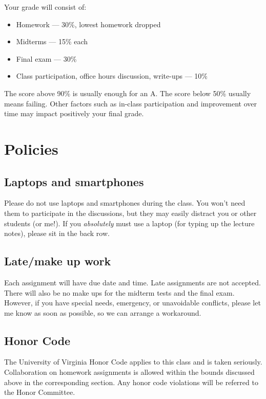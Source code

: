 \documentclass[oneside,11pt]{amsart}
\begin{document}
Your grade will consist of:
\begin{itemize}
	\item Homework --- 30\%, lowest homework dropped
	\item Midterms --- 15\% each
	\item Final exam --- 30\%
	\item Class participation, office hours discussion, write-ups --- 10\%
\end{itemize}
The score above 90\% is usually enough for an A.
The score below 50\% usually means failing.
Other factors such as in-class participation
and improvement over time may impact positively your final grade.













\section{Policies}

\subsection{Laptops and smartphones}

Please do not use laptops and smartphones during the class.
You won't need them to participate in the discussions, but they may easily distract
you or other students (or me!). If you \emph{absolutely} must use a laptop
(for typing up the lecture notes), please sit in the back row.

\subsection{Late/make up work} Each assignment will have due date and time.
Late assignments are not accepted. There will also be no make ups for the midterm tests and the final exam.
However, if you have special needs, emergency, or unavoidable conflicts, please
let me know as soon as possible, so we can arrange a workaround.

\subsection{Honor Code} The University of Virginia Honor Code applies to this
class and is taken seriously. Collaboration on homework
assignments is allowed within the bounds discussed above
in the corresponding section.
Any honor code violations will be referred to the
Honor Committee.
\end{document}
